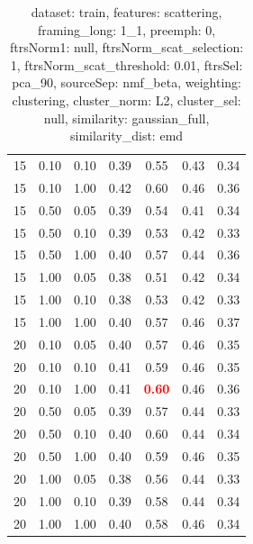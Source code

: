 \documentclass[12pt,a4paper,fleqn]{tufte-handout}
\begin{document}
\begin{table}
\begin{center}
\begin{tabular}{lllcccc}
15 & 0.10 & 0.10 & 0.39 & 0.55 & 0.43 & 0.34 \\                     
15 & 0.10 & 1.00 & 0.42 & 0.60 & 0.46 & 0.36 \\                     
15 & 0.50 & 0.05 & 0.39 & 0.54 & 0.41 & 0.34 \\                     
15 & 0.50 & 0.10 & 0.39 & 0.53 & 0.42 & 0.33 \\                     
15 & 0.50 & 1.00 & 0.40 & 0.57 & 0.44 & 0.36 \\                     
15 & 1.00 & 0.05 & 0.38 & 0.51 & 0.42 & 0.34 \\                     
15 & 1.00 & 0.10 & 0.38 & 0.53 & 0.42 & 0.33 \\                     
15 & 1.00 & 1.00 & 0.40 & 0.57 & 0.46 & 0.37 \\                     
20 & 0.10 & 0.05 & 0.40 & 0.57 & 0.46 & 0.35 \\                     
20 & 0.10 & 0.10 & 0.41 & 0.59 & 0.46 & 0.35 \\                     
20 & 0.10 & 1.00 & 0.41 & \textbf{\textcolor{red}{0.60}} & 0.46 & 0.36 \\                     
20 & 0.50 & 0.05 & 0.39 & 0.57 & 0.44 & 0.33 \\                     
20 & 0.50 & 0.10 & 0.40 & 0.60 & 0.44 & 0.34 \\                     
20 & 0.50 & 1.00 & 0.40 & 0.59 & 0.46 & 0.35 \\                     
20 & 1.00 & 0.05 & 0.38 & 0.56 & 0.44 & 0.33 \\                     
20 & 1.00 & 0.10 & 0.39 & 0.58 & 0.44 & 0.34 \\                     
20 & 1.00 & 1.00 & 0.40 & 0.58 & 0.46 & 0.34 \\                     
\end{tabular}                     
\end{center}                     
\caption{dataset: train, features: scattering, framing\_long: 1\_1, preemph: 0, ftrsNorm1: null, ftrsNorm\_scat\_selection: 1, ftrsNorm\_scat\_threshold: 0.01, ftrsSel: pca\_90, sourceSep: nmf\_beta, weighting: clustering, cluster\_norm: L2, cluster\_sel: null, similarity: gaussian\_full, similarity\_dist: emd}                     
\label{datasetrFeaturscFraminlong1_1Preemp0Ftrsnorm1nuFtrsnoscatselect1Ftrsnoscatthresh0.01Ftrsselpc90SourcesepnmbeWeightclClustenormL2ClusteselnuSimilagafuSimiladistem}                     
\end{table}                     
 
\end{document}
